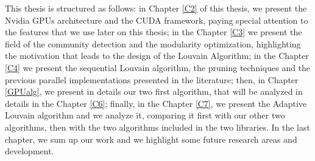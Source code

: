 This thesis is structured as follows:
in Chapter \ref{C2} of this thesis, we present the Nvidia GPUs architecture and the CUDA framework, paying special attention to the features that we use later on this thesis; in the Chapter \ref{C3} we present the field of the community detection and the modularity optimization, highlighting the motivation that leads to the design of the Louvain Algorithm; in the Chapter \ref{C4} we present the sequential Louvain algorithm, the pruning techniques and the previous parallel implementations presented in the literature;
then, in Chapter \ref{GPUalg}, we present in details our two first algorithm, that will be analyzed in details in the Chapter \ref{C6}; finally, in the Chapter \ref{C7}, we present the Adaptive Louvain algorithm and we analyze it, comparing it first with our other two algorithms, then with the two algorithms included in the two libraries. In the last chapter, we sum up our work and we highlight some future research areas and development.